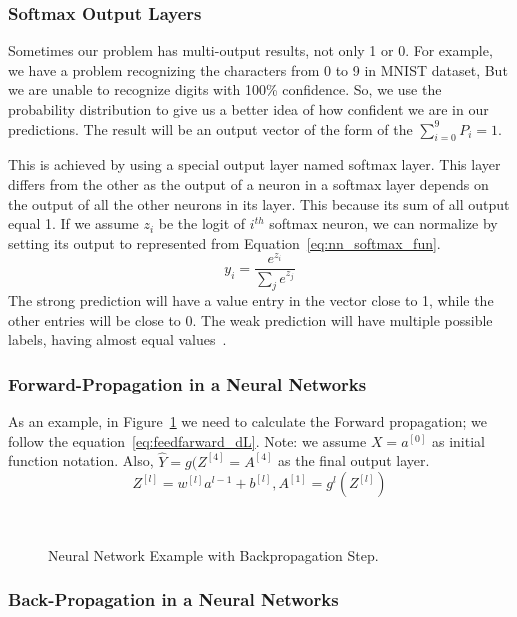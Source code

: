 \subsubsection{Softmax Output Layers}
Sometimes our problem has multi-output results, not only 1 or 0. For example, we have a problem recognizing the characters from 0 to 9 in MNIST dataset, But we are unable to recognize digits with 100\% confidence. So, we use the probability distribution to give us a better idea of how confident we are in our predictions. The result will be an output vector of the form of the $\sum_{i = 0}^9P_i=1$.

This is achieved by using a special output layer named softmax layer. This layer differs from the other as the output of a neuron in a softmax layer depends on the output of all the other neurons in its layer. This because its sum of all output equal 1. If we assume $z_i$ be the logit of $i^{th}$ softmax neuron, we can normalize by setting its output to represented from Equation~\eqref{eq:nn_softmax_fun}.%
\begin{equation}\label{eq:nn_softmax_fun}
 y_i=\frac{e^{z_i}}{\sum_je^{z_j}}
\end{equation}
%
The strong prediction will have a value entry in the vector close to 1, while the other entries will be close to 0. The weak prediction will have multiple possible labels, having almost equal values~\cite{DLFundamentals}.

\subsubsection{Forward-Propagation in a Neural Networks}
As an example, in Figure~\ref{Fig:NN_With_BP} we need to calculate the Forward propagation; we follow the equation~\eqref{eq:feedfarward_dL}. Note: we assume $X = a^{[0]}$ as initial function notation. Also, $\widehat{Y}= g(Z^{[4]}=A^{[4]}$ as the final output layer.%
\begin{equation}\label{eq:feedfarward_dL}
Z^{[l]} = w^{[l]} a^{l-1} + b^{[l]} , A^{[1]} = g^{l}(Z^{[l]})
\end{equation} %

\begin{figure}[t]

\caption{Neural Network Example with Backpropagation Step.}~\label{Fig:NN_With_BP}
\end{figure}%
\subsubsection{Back-Propagation in a Neural Networks}

